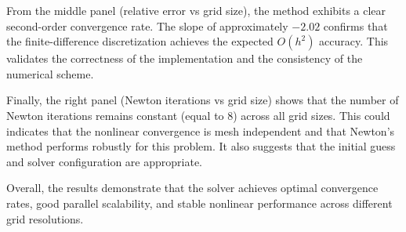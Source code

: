 \documentclass[12pt]{article}
\begin{document}
From the middle panel (relative error vs grid size), the method exhibits a clear second-order convergence rate. The slope of approximately $-2.02$ confirms that the finite-difference discretization achieves the expected $O(h^2)$ accuracy. This validates the correctness of the implementation and the consistency of the numerical scheme.

Finally, the right panel (Newton iterations vs grid size) shows that the number of Newton iterations remains constant (equal to 8) across all grid sizes. This could indicates that the nonlinear convergence is mesh independent and that Newton's method performs robustly for this problem. It also suggests that the initial guess and solver configuration are appropriate.

Overall, the results demonstrate that the solver achieves optimal convergence rates, good parallel scalability, and stable nonlinear performance across different grid resolutions.
\end{document}
